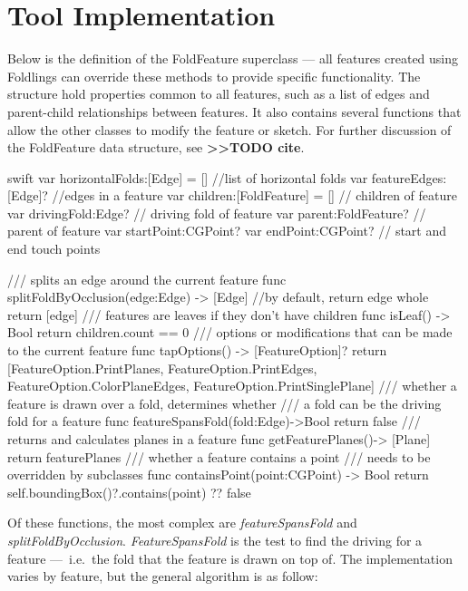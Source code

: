 \section{Tool Implementation}\label{tool-implementation}

Below is the definition of the FoldFeature superclass --- all features
created using Foldlings can override these methods to provide specific
functionality. The structure hold properties common to all features,
such as a list of edges and parent-child relationships between features.
It also contains several functions that allow the other classes to
modify the feature or sketch. For further discussion of the FoldFeature
data structure, see \textbf{\textgreater{}\textgreater{}TODO cite}.

\small
\singlespacing 

\begin{pygmented}{swift}
var horizontalFolds:[Edge] = [] //list of horizontal folds
var featureEdges:[Edge]?        //edges in a feature
var children:[FoldFeature] = [] // children of feature
var drivingFold:Edge? // driving fold of feature
var parent:FoldFeature? // parent of feature
var startPoint:CGPoint?
var endPoint:CGPoint? // start and end touch points

/// splits an edge around the current feature
func splitFoldByOcclusion(edge:Edge) -> [Edge]
{
//by default, return edge whole
return [edge]
}
/// features are leaves if they don't have children
func isLeaf() -> Bool
{
return children.count == 0
}
/// options or modifications that can be made to the current feature
func tapOptions() -> [FeatureOption]?
{
  return [FeatureOption.PrintPlanes, FeatureOption.PrintEdges,
  FeatureOption.ColorPlaneEdges, FeatureOption.PrintSinglePlane]
}
/// whether a feature is drawn over a fold, determines whether 
/// a fold can be the driving fold for a feature
  func featureSpansFold(fold:Edge)->Bool
{
  return false
}
/// returns and calculates planes in a feature
func getFeaturePlanes()-> [Plane]{
  return featurePlanes
}
/// whether a feature contains a point
/// needs to be overridden by subclasses
func containsPoint(point:CGPoint) -> Bool{
  return self.boundingBox()?.contains(point) ?? false
}
\end{pygmented}

\doublespacing
\normalsize

Of these functions, the most complex are \emph{featureSpansFold} and
\emph{splitFoldByOcclusion}. \emph{FeatureSpansFold} is the test to find
the driving for a feature ---~i.e.~the fold that the feature is drawn on
top of. The implementation varies by feature, but the general algorithm
is as follow:

